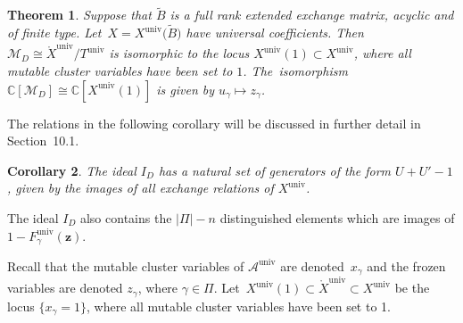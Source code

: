 \documentclass[10pt,a4paper]{amsart}
\def\C{{\mathbb C}}
\def\A{{\mathcal{A}}}
\def\Xo{{\mathring{X}}}
\def\univ{{\operatorname{univ}}}
\def\tB{{\tilde B}}
\def\M{{\mathcal{M}}}
\def\tB{{\tilde B}}
\def\z{{\mathbf z}}
\numberwithin{equation}{section}
\newtheorem{Theorem}{Theorem}[section]
\newtheorem{Corollary}[Theorem]{Corollary}
\begin{document}
\begin{Theorem}\label{thm:univ}
Suppose that $\tB$ is a full rank extended exchange matrix, acyclic and of finite type. Let~$X= X^\univ\big(\tB\big)$ have universal coefficients. Then $\M_D \cong \Xo^\univ/T^\univ$ is isomorphic to the locus $X^\univ(1) \subset X^\univ$, where all mutable cluster variables have been set to $1$. The~isomorphism $\C[\M_D] \cong \C[X^\univ(1)]$ is given by $u_\gamma \mapsto z_\gamma$.
\end{Theorem}

\bigskip{}
The relations in the following corollary will be discussed in further detail in Section~10.1.
\begin{Corollary}\label{cor:ext}
The ideal $I_D$ has a natural set of generators of the form $U + U' - 1$, given by the images of all exchange relations of $X^\univ$. \end{Corollary}
The ideal $I_D$ also contains the $|\Pi|-n$ distinguished elements which are images of $1 - F^\univ_\gamma(\z)$.

\bigskip{} %
Recall that the mutable cluster variables of $\A^\univ$ are denoted~$x_\gamma$ and the frozen variables are denoted $z_\gamma$, where $\gamma \in \Pi$. Let~$X^\univ(1) \subset \Xo^\univ \subset X^\univ$ be the locus $\{x_\gamma = 1\}$, where all mutable cluster variables have been set to 1.
\end{document}

